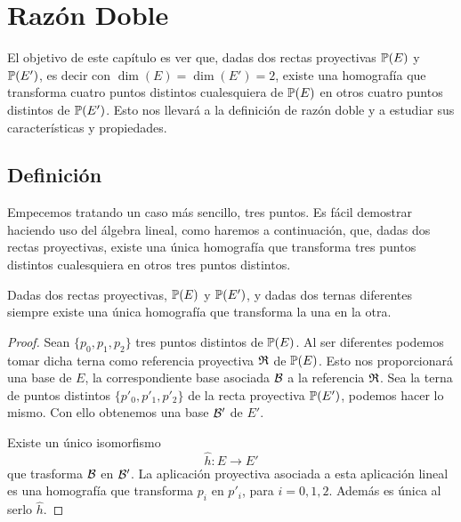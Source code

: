 \chapter{Razón Doble}
El objetivo de este capítulo es ver que, dadas dos rectas proyectivas $\mathbb{P}(E)$ y $\mathbb{P}(E')$, es decir con $\dim(E)=\dim(E')=2$,  existe una homografía que transforma cuatro puntos distintos cualesquiera de $\mathbb{P}(E)$ en otros cuatro puntos distintos de $\mathbb{P}(E')$. Esto nos llevará a la definición de razón doble y a estudiar sus características y propiedades.

\section{Definición}
Empecemos tratando un caso más sencillo, tres puntos. Es fácil demostrar haciendo uso del álgebra lineal, como haremos a continuación, que, dadas dos rectas proyectivas, existe una única homografía que transforma tres puntos distintos cualesquiera en otros tres puntos distintos.

\begin{prop}
	Dadas dos rectas proyectivas, $\mathbb{P}(E)$ y $\mathbb{P}(E')$, y dadas dos ternas diferentes siempre existe una única homografía que transforma la una en la otra.
\end{prop}
\begin{proof}
	Sean $\{p_0,p_1,p_2\}$ tres puntos distintos de $\mathbb{P}(E)$. Al ser diferentes podemos tomar dicha terna como referencia proyectiva $\mathfrak{R}$ de $\mathbb{P}(E)$. Esto nos proporcionará una base de $E$, la correspondiente base asociada $\mathcal{B}$ a la referencia $\mathfrak{R}$. Sea la terna de puntos distintos $\{p'_0,p'_1,p'_2\}$ de la recta proyectiva $\mathbb{P}(E')$, podemos hacer lo mismo. Con ello obtenemos una base $\mathcal{B'}$ de $E'$. 
	
	Existe un único isomorfismo 
	\[\widehat{h}:E\rightarrow E'\]
	que trasforma $\mathcal{B}$ en $\mathcal{B'}$. La aplicación proyectiva asociada a esta aplicación lineal es una homografía que transforma $p_i$ en $p'_i$, para $i=0,1,2$. Además es única al serlo $\widehat{h}$.
\end{proof}

